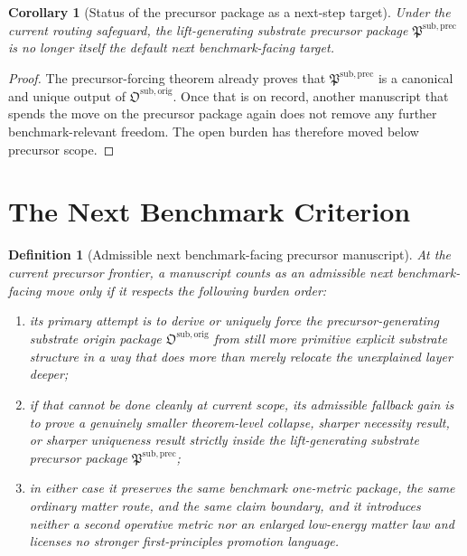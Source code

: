 \documentclass[11pt]{article}
\newcommand{\PrecursorPackage}{\mathfrak P^{\mathrm{sub,prec}}}
\newcommand{\OriginPackage}{\mathfrak O^{\mathrm{sub,orig}}}
\newtheorem{definition}{Definition}
\newtheorem{corollary}{Corollary}
\begin{document}
\begin{corollary}[Status of the precursor package as a next-step target]
Under the current routing safeguard, the lift-generating substrate precursor package \(\PrecursorPackage\) is no longer itself the default next benchmark-facing target.
\end{corollary}

\begin{proof}
The precursor-forcing theorem already proves that \(\PrecursorPackage\) is a canonical and unique output of \(\OriginPackage\). Once that is on record, another manuscript that spends the move on the precursor package again does not remove any further benchmark-relevant freedom. The open burden has therefore moved below precursor scope.
\end{proof}

\section{The Next Benchmark Criterion}

\begin{definition}[Admissible next benchmark-facing precursor manuscript]
At the current precursor frontier, a manuscript counts as an admissible next benchmark-facing move only if it respects the following burden order:
\begin{enumerate}
    \item its primary attempt is to derive or uniquely force the precursor-generating substrate origin package \(\OriginPackage\) from still more primitive explicit substrate structure in a way that does more than merely relocate the unexplained layer deeper;
    \item if that cannot be done cleanly at current scope, its admissible fallback gain is to prove a genuinely smaller theorem-level collapse, sharper necessity result, or sharper uniqueness result strictly inside the lift-generating substrate precursor package \(\PrecursorPackage\);
    \item in either case it preserves the same benchmark one-metric package, the same ordinary matter route, and the same claim boundary, and it introduces neither a second operative metric nor an enlarged low-energy matter law and licenses no stronger first-principles promotion language.
\end{enumerate}
\end{definition}
\end{document}

